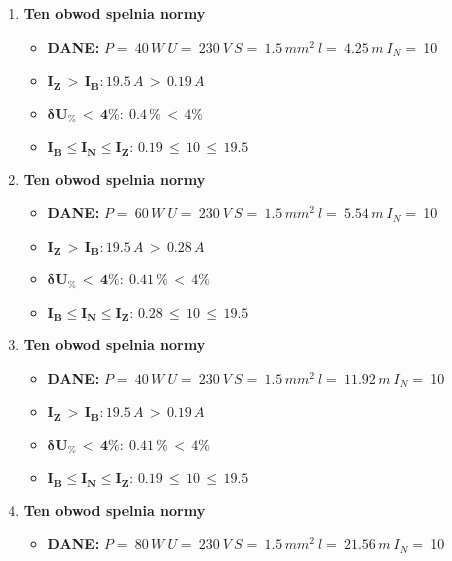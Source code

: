 \begin{enumerate}
\item \textcolor{Green}{\cmark} \textbf{Ten obwod spelnia normy} 
\begin{itemize}
\item[] \textbf{DANE: } \: $ P = \:40\, W\: U = \:230\: V\: S = \:1.5\, mm^2\: l = \:4.25\, m\: I_N= \: $10
\item[\textcolor{Green}{\cmark}] $ \pmb{I_Z \, >  \, I_B: }19.5 \, A \, > \,0.19 \, A $
\item[\textcolor{Green}{\cmark}] $ \pmb{ \delta U_\% \, < \, 4\%:} \:0.4 \, \% \,< \, 4\% $
\item[\textcolor{Green}{\cmark}] $ \pmb{I_B \le I_N \le I_Z: } \, 0.19 \, \le \,10 \, \le \,19.5 $
\end{itemize}
\item \textcolor{Green}{\cmark} \textbf{Ten obwod spelnia normy} 
\begin{itemize}
\item[] \textbf{DANE: } \: $ P = \:60\, W\: U = \:230\: V\: S = \:1.5\, mm^2\: l = \:5.54\, m\: I_N= \: $10
\item[\textcolor{Green}{\cmark}] $ \pmb{I_Z \, >  \, I_B: }19.5 \, A \, > \,0.28 \, A $
\item[\textcolor{Green}{\cmark}] $ \pmb{ \delta U_\% \, < \, 4\%:} \:0.41 \, \% \,< \, 4\% $
\item[\textcolor{Green}{\cmark}] $ \pmb{I_B \le I_N \le I_Z: } \, 0.28 \, \le \,10 \, \le \,19.5 $
\end{itemize}
\item \textcolor{Green}{\cmark} \textbf{Ten obwod spelnia normy} 
\begin{itemize}
\item[] \textbf{DANE: } \: $ P = \:40\, W\: U = \:230\: V\: S = \:1.5\, mm^2\: l = \:11.92\, m\: I_N= \: $10
\item[\textcolor{Green}{\cmark}] $ \pmb{I_Z \, >  \, I_B: }19.5 \, A \, > \,0.19 \, A $
\item[\textcolor{Green}{\cmark}] $ \pmb{ \delta U_\% \, < \, 4\%:} \:0.41 \, \% \,< \, 4\% $
\item[\textcolor{Green}{\cmark}] $ \pmb{I_B \le I_N \le I_Z: } \, 0.19 \, \le \,10 \, \le \,19.5 $
\end{itemize}
\item \textcolor{Green}{\cmark} \textbf{Ten obwod spelnia normy} 
\begin{itemize}
\item[] \textbf{DANE: } \: $ P = \:80\, W\: U = \:230\: V\: S = \:1.5\, mm^2\: l = \:21.56\, m\: I_N= \: $10

\end{itemize}
\end{enumerate}
